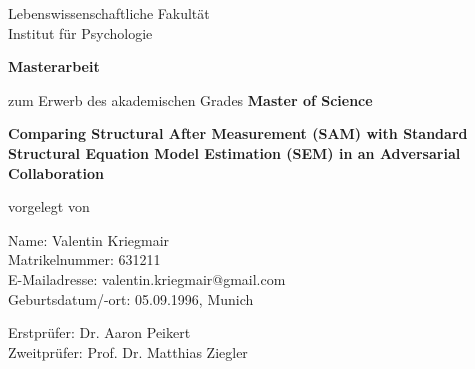 \documentclass[11pt, a4paper]{article}
\begin{document}
\thispagestyle{empty} 



\vspace{4.5cm}
\raggedright
{\large Lebenswissenschaftliche Fakultät}\\
Institut für Psychologie

\vspace{1.2cm}

\begin{center}
    \textbf{\Large Masterarbeit} \\

    \vspace{0.8cm}

    zum Erwerb des akademischen Grades \textbf{Master of Science}

    \vspace{1.5cm}

    \textbf{\large Comparing Structural After Measurement (SAM) with Standard Structural Equation Model Estimation (SEM) in an Adversarial Collaboration}
\end{center}

\vspace{2cm}

\raggedright
vorgelegt von

\vspace{0.8cm}

Name: Valentin Kriegmair \\
Matrikelnummer: 631211 \\
E-Mailadresse: valentin.kriegmair@gmail.com \\
Geburtsdatum/-ort: 05.09.1996, Munich

\vspace{2cm}

Erstprüfer: Dr. Aaron Peikert \\
Zweitprüfer: Prof. Dr. Matthias Ziegler

\vfill
\end{document}
